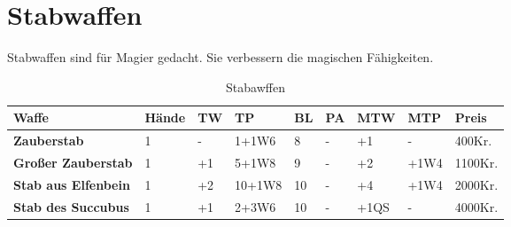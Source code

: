 \section{Stabwaffen}
Stabwaffen sind für Magier gedacht. Sie verbessern die magischen Fähigkeiten.

\begin{table}[H]
\begin{center}
\begin{tabular}{|l|l|l|l|l|l|l|l|l|}
\hline
\textbf{Waffe} & \textbf{Hände} & \textbf{TW} & \textbf{TP} & \textbf{BL} & \textbf{PA} & \textbf{MTW} & \textbf{MTP} & \textbf{Preis} \\

\hline
\textbf{Zauberstab} & 1 & - & 1+1W6 & 8 & - & +1 & - & 400Kr. \\

\hline
\textbf{Großer Zauberstab} & 1 & +1 & 5+1W8 & 9 & - & +2 & +1W4 & 1100Kr. \\

\hline
\textbf{Stab aus Elfenbein} & 1 & +2 & 10+1W8 & 10 & - & +4 & +1W4 & 2000Kr. \\

\hline
\textbf{Stab des Succubus} & 1 & +1 & 2+3W6 & 10 & - & +1QS & - & 4000Kr. \\

\hline
\end{tabular}
\end{center}
\caption{Stabawffen}
\label{tab:Stabawffen}
\end{table}
